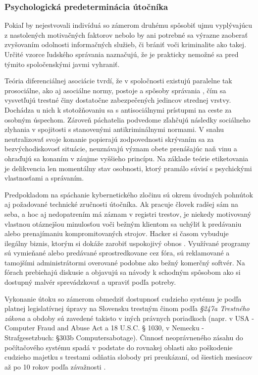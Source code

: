 \documentclass[12pt, a4paper]{article}
\begin{document}
\subsubsection{Psychologická predeterminácia útočníka}
Pokiaľ by nejestvovali indivíduá so zámerom druhému spôsobiť ujmu vyplývajúcu z nastolených motivačných
faktorov nebolo by ani potrebné sa výrazne zaoberať zvyšovaním odolnosti informačných služieb, či brániť
voči kriminalite ako takej. Určité vzorce ľudského správania naznačujú, že je prakticky nemožné sa pred 
týmito spoločenskými javmi vyhraniť.

Teória diferenciálnej asociácie tvrdí, že v spoločnosti existujú paralelne tak prosociálne, ako aj asociálne 
normy, postoje a spôsoby správania \cite{heretik}, čím sa vysvetľujú trestné činy dostatočne zabezpečených 
jedincov strednej vrstvy. Dochádza u nich k stotožňovaniu sa s antisociálnymi prístupmi na ceste za osobným 
úspechom. Zároveň páchatelia podvedome zľahčujú následky  sociálneho zlyhania v spojitosti s stanovenými 
antikriminálnymi normami. V snahu neutralizovať svoje konanie popierajú zodpovednosti skrývaním sa za 
bezvýchodiskovosť situácie, neuznávajú význam obete  prenášajúc naň vinu a ohraďujú sa konaním v záujme 
vyššieho princípu. Na základe teórie etiketovania je delikvencia len momentálny stav osobnosti, ktorý 
pramálo súvisí s psychickými vlastnosťami a správaním.

Predpokladom na spáchanie kybernetického zločinu sú okrem úvodných pohnútok aj požadované technické 
zručnosti útočníka. Ak pracuje človek radšej sám na seba, a hoc aj nedopatrením má záznam v registri 
trestov, je niekedy motivovaný vlastnou otáznejšou minulosťou voči bežným klientom sa uchýliť k predávaniu 
alebo prenajímaniu kompromitovaných strojov. Hacker si časom vybuduje ilegálny biznis, ktorým si dokáže 
zarobiť uspokojivý obnos \cite{infiltrating-botnet}. Využívané programy sú vymieňané alebo predávané 
sprostredkovane cez fóra, sú reklamované a tamojšími administrátormi overované podobne ako bežný komerčný 
softvér. Na fórach  prebiehajú diskusie a objavujú sa návody k schodným spôsobom ako si dostupný malvér 
sprevádzkovať a upraviť podľa potreby.

Vykonanie útoku so zámerom obmedziť dostupnosť cudzieho systému je podľa platnej legislatívnej úpravy 
na Slovensku trestným činom podľa \emph{§247a Trestného zákona} a obdoby sú zavedené takisto v iných 
právnych poriadkoch (napr. v USA - Computer Fraud and Abuse Act a 18 U.S.C. § 1030, v Nemecku - 
Strafgesetzbuch: §303b  Computersabotage). Činnosť neoprávneného zásahu do počítačového systému spadá v 
podstate do rovnakej oblasti ako poškodenie cudzieho majetku s trestami odňatia slobody pri preukázaní, od 
šiestich mesiacov až po 10 rokov podľa závažnosti \cite{trestny-zakon}. 
\end{document}
